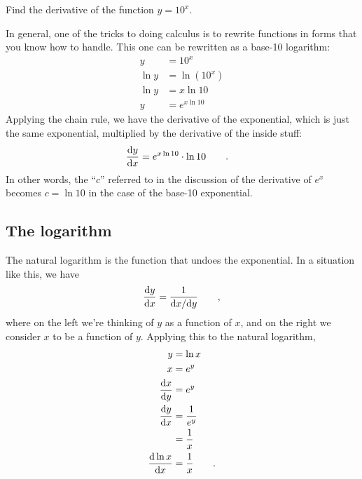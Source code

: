 \begin{eg}
\egquestion Find the derivative of the function $y=10^x$.

\eganswer In general, one of the tricks to doing calculus is to rewrite functions in forms that
you know how to handle. This one can be rewritten as a base-10 logarithm:
\begin{align*}
  y &= 10^x \\
  \ln y &= \ln\left(10^x\right) \\
  \ln y &= x \ln 10 \\
  y &= e^{x\ln 10}
\end{align*}
Applying the chain rule, we have the derivative of the exponential, which is just the same
exponential, multiplied by the derivative of the inside stuff:
\begin{align*}
  \frac{\textup{d} y}{\textup{d} x} &= e^{x\ln 10} \cdot \ln 10 \qquad .
\end{align*}
In other words, the ``$c$'' referred to in the discussion of the derivative of $e^x$ becomes
$c=\ln 10$ in the case of the base-10 exponential.
\end{eg}

\subsection{The logarithm}

The natural logarithm is the function that undoes the exponential. In a situation like this, we
have
\begin{equation*}
  \frac{\textup{d} y}{\textup{d} x} = \frac{1}{\textup{d} x/\textup{d} y} \qquad ,
\end{equation*}
where on the left we're thinking of $y$ as a function of $x$, and on the right we consider
$x$ to be a function of $y$. Applying this to the natural logarithm,
\begin{align*}
  y &= \ln x \\
  x &= e^y \\
  \frac{\textup{d} x}{\textup{d} y} &= e^y \\
  \frac{\textup{d} y}{\textup{d} x} &= \frac{1}{e^y} \\
                        & = \frac{1}{x} \\
  \frac{\textup{d} \ln x}{\textup{d} x} &= \frac{1}{x} \qquad .
\end{align*}

